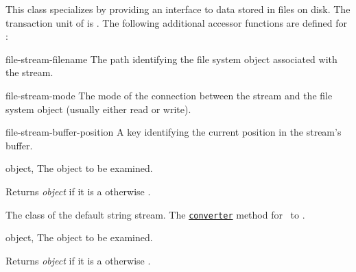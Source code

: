 \begin{optDefinition}
%
This class specializes  by providing an interface to data
stored in files on disk. The transaction unit of  is
. The following additional accessor functions are defined for
:
%
\begin{functions}
    \item[file-stream-filename] The path identifying the file system object
    associated with the stream.
    \item[file-stream-mode] The mode of the connection between the stream and
    the file system object (usually either read or write).
    \item[file-stream-buffer-position] A key identifying the current position in
    the stream's buffer.
\end{functions}

\begin{arguments}
  \item[object, \classref{object}] The object to be examined.
\end{arguments}
%
\result%
Returns {\em object\/} if it is a  otherwise \nil.

%
The class of the default string stream.
%
\seealso The \hyperref[stringstrconv]{\tt converter} method for
\ to .

\begin{arguments}
    \item[object, \classref{object}] The object to be examined.
\end{arguments}
%
\result%
Returns {\em object\/} if it is a  otherwise \nil.


\end{optDefinition}
